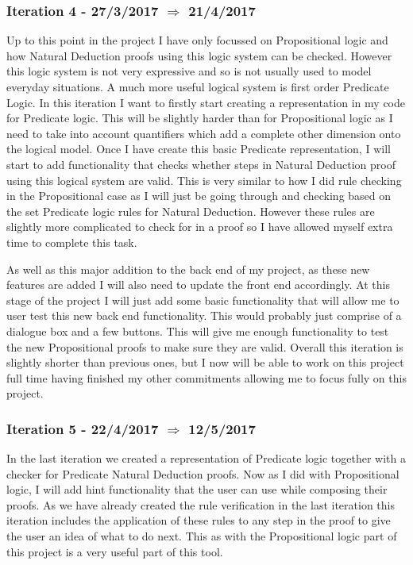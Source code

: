 \subsubsection{Iteration 4 - 27/3/2017 $\Rightarrow$ 21/4/2017}

Up to this point in the project I have only focussed on Propositional logic and how Natural Deduction proofs using this logic system can be checked. However this logic system is not very expressive and so is not usually used to model everyday situations. A much more useful logical system is first order Predicate Logic. In this iteration I want to firstly start creating a representation in my code for Predicate logic. This will be slightly harder than for Propositional logic as I need to take into account quantifiers which add a complete other dimension onto the logical model. Once I have create this basic Predicate representation, I will start to add functionality that checks whether steps in Natural Deduction proof using this logical system are valid. This is very similar to how I did rule checking in the Propositional case as I will just be going through and checking based on the set Predicate logic rules for Natural Deduction. However these rules are slightly more complicated to check for in a proof so I have allowed myself extra time to complete this task. 

As well as this major addition to the back end of my project, as these new features are added I will also need to update the front end accordingly. At this stage of the project I will just add some basic functionality that will allow me to user test this new back end functionality. This would probably just comprise of a dialogue box and a few buttons. This will give me enough functionality to test the new Propositional proofs to make sure they are valid. Overall this iteration is slightly shorter than previous ones, but I now will be able to work on this project full time having finished my other commitments allowing me to focus fully on this project. 

\subsubsection{Iteration 5 - 22/4/2017 $\Rightarrow$ 12/5/2017}

In the last iteration we created a representation of Predicate logic together with a checker for Predicate Natural Deduction proofs. Now as I did with Propositional logic, I will add hint functionality that the user can use while composing their proofs. As we have already created the rule verification in the last iteration this iteration includes the application of these rules to any step in the proof to give the user an idea of what to do next. This as with the Propositional logic part of this project is a very useful part of this tool. 

